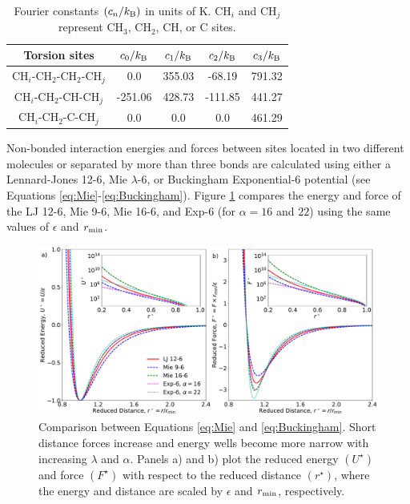 \documentclass[preprint,letterpaper,floatfix,citeautoscript,aip,jcp]{revtex4-1}
\begin{document}
\begin{table}[h!]
	\caption{Fourier constants $(c_n/k_{\rm B})$ in units of K.\cite{Martin1999} CH$_i$ and CH$_j$ represent CH$_3$, CH$_2$, CH, or C sites.} \label{tab:torsions}
	\begin{center}
		\begin{tabular}{|c|c|c|c|c|}
			\hline
			Torsion sites & $c_0/k_{\rm B}$ & $c_1/k_{\rm B}$ & $c_2/k_{\rm B}$ & $c_3/k_{\rm B}$ \\ \hline
			CH$_i$-CH$_2$-CH$_2$-CH$_j$ & 0.0 & 355.03 & -68.19 & 791.32 \\ 
            CH$_i$-CH$_2$-CH-CH$_j$ & -251.06 & 428.73 & -111.85 & 441.27 \\
            CH$_i$-CH$_2$-C-CH$_j$ & 0.0 & 0.0 & 0.0 & 461.29 \\
			\hline
		\end{tabular}
	\end{center} 
\end{table}
Non-bonded interaction energies and forces between sites located in two different molecules or separated by more than three bonds are calculated using either a Lennard-Jones 12-6, Mie $\lambda$-6, or Buckingham Exponential-6 potential (see Equations \ref{eq:Mie}-\ref{eq:Buckingham}). Figure \ref{fig:UF_Mie_Exp6} compares the energy and force of the LJ 12-6, Mie 9-6, Mie 16-6, and Exp-6 (for $\alpha = 16$ and $22$) using the same values of $\epsilon$ and $r_{\rm min}$.

\begin{figure}[htb!]
	\centering
	\includegraphics[width=6.4in]{UF_Mie_Exp6}
	\caption{Comparison between Equations \ref{eq:Mie} and \ref{eq:Buckingham}. Short distance forces increase and energy wells become more narrow with increasing $\lambda$ and $\alpha$. Panels a) and b) plot the reduced energy $(U^\star)$ and force $(F^\star)$ with respect to the reduced distance $(r^\star)$, where the energy and distance are scaled by $\epsilon$ and $r_{\rm min}$, respectively.}
	\label{fig:UF_Mie_Exp6}
\end{figure}
\end{document}
